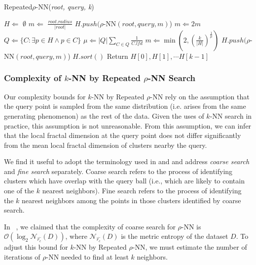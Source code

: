 \begin{algorithm} %
    \caption{Repeated$\rho$-NN(\emph{root, query, k})} %
    \label{alg:knn-by-rnn} %
    \begin{algorithmic} %
        \STATE $H \Leftarrow$ $\emptyset$
        \STATE $m \Leftarrow$ $\frac{root.radius}{|root|}$
            \STATE $H.push(\rho$-NN$(root, query, m)$)
            \STATE $m \Leftarrow 2m$
        \ENDWHILE
            \STATE $Q \Leftarrow \{ C: \exists p \in H \land p \in C \}$
            \STATE $\mu \Leftarrow |Q| \sum_{C \in Q} \frac{1}{C.lfd} $
            \STATE $m \Leftarrow \min \left(2, \left({\frac{k}{|H|}}\right)^{\frac{1}{\mu}}\right)$
            \STATE $H.push(\rho$-NN$(root, query, m)$)
        \ENDWHILE
        \STATE $H.sort()$
        \STATE Return $H[0], H[1], \cdots H[k-1]$
    \end{algorithmic}
    \end{algorithm}

\subsubsection{Complexity of \texorpdfstring{$k$}{k}-NN by Repeated \texorpdfstring{$\rho$}{p}-NN Search}
\label{subsubsec:methods:repeated-rnn-complexity}

Our complexity bounds for $k$-NN by Repeated $\rho$-NN rely on the assumption that the query point is sampled from the same distribution
(i.e. arises from the same generating phenomenon) as the rest of the data. Given the uses of $k$-NN search in practice, 
this assumption is not unreasonable. From this assumption, we can infer that the local fractal dimension
at the query point does not differ significantly from the mean local fractal dimension of clusters nearby the query.

We find it useful to adopt the terminology used in 
\cite{ishaq2019clustered} and \cite{yu2015entropy} and address \emph{coarse search} and \emph{fine search} separately. 
Coarse search refers to the process of identifying clusters
which have overlap with the query ball (i.e., which are likely to contain one of the $k$ nearest neighbors). 
Fine search refers to the process
of identifying the $k$ nearest neighbors among the points in those clusters identified by coarse search.

In ~\cite{ishaq2019clustered}, we claimed that the complexity of coarse search for $\rho$-NN is $\mathcal{O}(\log_2\mathcal{N}_{\hat{r_c}}(D))$, 
where $\mathcal{N}_{\hat{r_c}}(D)$ is the metric entropy of the dataset $D$. 
To adjust this bound for $k$-NN by Repeated $\rho$-NN, we must estimate the number of iterations 
of $\rho$-NN needed to find at least $k$ neighbors. 
    

